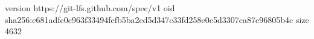 version https://git-lfs.github.com/spec/v1
oid sha256:c681adfc0c963f33494fefb5ba2ed5d347c33fd258e0c5d3307ca87e96805b4c
size 4632
